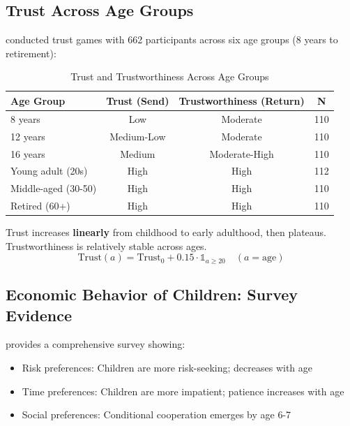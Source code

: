 \subsection{Trust Across Age Groups}

\citet{sutter2007trust} conducted trust games with 662 participants across six age groups (8 years to retirement):

\begin{table}[htbp]
\centering
\caption{Trust and Trustworthiness Across Age Groups}
\label{tab:su-trust-age}
\renewcommand{\arraystretch}{1.3}
\begin{tabular}{@{}lccc@{}}
\toprule
\textbf{Age Group} & \textbf{Trust (Send)} & \textbf{Trustworthiness (Return)} & \textbf{N} \\
\midrule
8 years & Low & Moderate & 110 \\
12 years & Medium-Low & Moderate & 110 \\
16 years & Medium & Moderate-High & 110 \\
Young adult (20s) & High & High & 112 \\
Middle-aged (30-50) & High & High & 110 \\
Retired (60+) & High & High & 110 \\
\bottomrule
\end{tabular}
\end{table}

\begin{tcolorbox}[colback=green!5!white, colframe=green!75!black,
    title=Key Result SU-2: Age-Trust Gradient]
Trust increases \textbf{linearly} from childhood to early adulthood, then plateaus. Trustworthiness is relatively stable across ages.
\begin{equation}
\text{Trust}(a) = \text{Trust}_0 + 0.15 \cdot \mathbb{1}_{a \geq 20} \quad (a = \text{age})
\end{equation}
\end{tcolorbox}

\subsection{Economic Behavior of Children: Survey Evidence}

\citet{sutter2019economic} provides a comprehensive survey showing:
\begin{itemize}
\item Risk preferences: Children are more risk-seeking; decreases with age
\item Time preferences: Children are more impatient; patience increases with age
\item Social preferences: Conditional cooperation emerges by age 6-7
\end{itemize}

